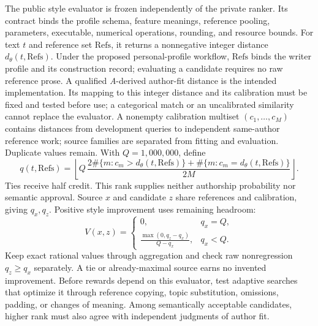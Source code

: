 The public style evaluator is frozen independently of the private ranker. Its
contract binds the profile schema, feature meanings, reference pooling,
parameters, executable, numerical operations, rounding, and resource bounds.
For text \(t\) and reference set \(\mathrm{Refs}\), it returns a nonnegative
integer distance \(d_\theta(t,\mathrm{Refs})\). Under the proposed personal-profile
workflow, \(\mathrm{Refs}\) binds the writer profile and its construction
record; evaluating a candidate requires no raw reference prose. A qualified
\textit{A}-derived author-fit distance is the intended implementation. Its
mapping to this integer distance and its calibration must be fixed and tested
before use; a categorical match or an uncalibrated similarity cannot replace
the evaluator. A nonempty calibration multiset
\((c_1,\ldots,c_M)\) contains distances from development queries to independent
same-author reference work; source families are separated from fitting and
evaluation. Duplicate values remain. With \(Q=1{,}000{,}000\), define
\begin{equation}\label{eq:style-fit}
 q(t,\mathrm{Refs})=\left\lfloor
 Q\,\frac{2\#\{m:c_m>d_\theta(t,\mathrm{Refs})\}
             +\#\{m:c_m=d_\theta(t,\mathrm{Refs})\}}{2M}
 \right\rfloor.
\end{equation}
Ties receive half credit. This rank supplies neither authorship probability nor
semantic approval. Source \(x\) and candidate \(z\) share references and
calibration, giving \(q_x,q_z\). Positive style improvement uses remaining
headroom:
\begin{equation}\label{eq:style-utility}
 V(x,z)=\begin{cases}
 0,&q_x=Q,\\
 \displaystyle\frac{\max(0,q_z-q_x)}{Q-q_x},&q_x<Q.
 \end{cases}
\end{equation}
Keep exact rational values through aggregation and check raw nonregression
\(q_z\geq q_x\) separately. A tie or already-maximal source earns no invented
improvement. Before rewards depend on this evaluator, test adaptive searches
that optimize it through reference copying, topic substitution, omissions,
padding, or changes of meaning. Among semantically acceptable candidates,
higher rank must also agree with independent judgments of author fit.

